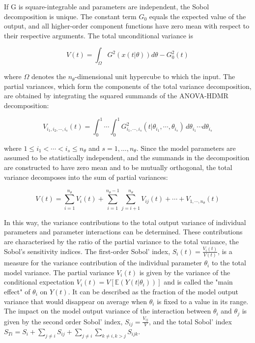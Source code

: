 \documentclass[a4paper,fleqn]{cas-dc}
\begin{document}
		If G is square-integrable and parameters are independent, the Sobol decomposition is unique. The constant term $G_0$ equals the expected value of the output, and all higher-order component functions have zero mean with respect to their respective arguments. The total unconditional variance is
		
		{\footnotesize
			\begin{equation}
				V(t) = \int_{\Omega} G^2\left(x\left(t|\theta\right)\right) d\theta - G_0^2(t)
		\end{equation}}
		
		where $\Omega$ denotes the $n_\theta$-dimensional unit hypercube to which the input. The partial variances, which form the components of the total variance decomposition, are obtained by integrating the squared summands of the ANOVA-HDMR decomposition:
		
		{\footnotesize
			\begin{equation} 
				V_{i_1, i_2, \cdots, i_s}(t) = \int_{0}^{1} \cdots \int_{0}^{1} 
				G^2_{i_1, \cdots, i_s} (t|\theta_{i_1}, \cdots, \theta_{i_s})\, 
				d\theta_{i_1} \cdots d\theta_{i_s}
		\end{equation}}
		
		where $1 \leq i_1 < \cdots < i_s \leq n_\theta$ and $s = 1, \ldots, n_\theta$. Since the model parameters are assumed to be statistically independent, and the summands in the decomposition are constructed to have zero mean and to be mutually orthogonal, the total variance decomposes into the sum of partial variances:
		
		{\footnotesize
			\begin{equation} \label{EQ:Sobol_decom}
				V(t) = \sum_{i=1}^{n_\theta}V_i(t) 
				+ \sum_{i=1}^{n_\theta-1}\sum_{j=i+1}^{n_\theta} V_{ij}(t) 
				+ \cdots + V_{1, \cdots, n_\theta}(t)
		\end{equation}}
		
		In this way, the variance contributions to the total output variance of individual parameters and parameter interactions can be determined. These contributions are characterised by the ratio of the partial variance to the total variance, the Sobol's sensitivity indices. The first-order Sobol' index, $S_i(t) = \frac{V_i(t)}{V(t)}$, is a measure for the variance contribution of the individual parameter $\theta_i$ to the total model variance. The partial variance $V_i(t)$ is given by the variance of the conditional expectation $V_i(t) = V[\mathbb{E}(Y(t|\theta_i))]$ and is called the "main effect" of $\theta_i$ on $Y(t)$. It can be described as the fraction of the model output variance that would disappear on average when $\theta_i$ is fixed to a value in its range. The impact on the model output variance of the interaction between $\theta_i$ and $\theta_j$ is given by the second order Sobol' index, $S_{ij} = \frac{V_{ij}}{V}$, and the total Sobol' index $S_{Ti} = S_i + \sum_{j \neq i} S_{ij} + \sum_{j \neq i} \sum_{k \neq i, k>j} S_{ijk} $.
		
\end{document}
